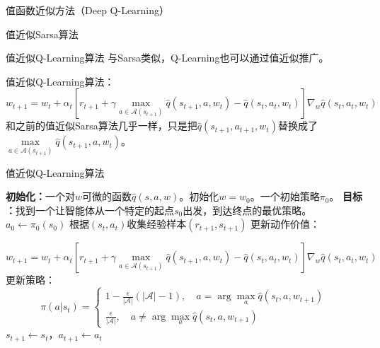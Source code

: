 \begin{section}{值函数近似方法\alert{（Deep Q-Learning）}}
\begin{frame}{值近似Sarsa算法}
\begin{center}
\begin{minipage}{0.3\textwidth}
        \end{minipage}
    \end{center}
    
\end{frame}

\begin{frame}{值近似Q-Learning算法}
    与Sarsa类似，Q-Learning也可以通过值近似推广。

    值近似Q-Learning算法：
    \alert{\[
        w_{t+1}=w_t+\alpha_t\left[r_{t+1}+\gamma \underset{a\in \mathcal{A}(s_{t+1})}{\max}\hat{q}(s_{t+1},a,w_t)-\hat{q}(s_t,a_t,w_t)\right]\nabla_w\hat{q}(s_t,a_t,w_t)
    \]}
    和之前的值近似Sarsa算法几乎一样，只是把$\hat{q}(s_{t+1},a_{t+1},w_t)$替换成了$\underset{a\in \mathcal{A}(s_{t+1})}{\max}\hat{q}(s_{t+1},a,w_t)$。
\end{frame}

\begin{frame}{值近似Q-Learning算法}
    \begin{algorithmic}[1]
        \State \textbf{初始化：}一个对$w$可微的函数$\hat{q}(s,a,w)$。初始化$w=w_0$。一个初始策略$\pi_0$。
        \State \textbf{目标 ：}找到一个让智能体从一个特定的起点$s_0$出发，到达终点的最优策略。
            \State $a_0\leftarrow\pi_0(s_0)$
                \State 根据$(s_t,a_t)$收集经验样本$(r_{t+1}, s_{t+1})$
                \State 更新动作价值：

                $w_{t+1}=w_t+\alpha_t[r_{t+1}+\gamma \underset{a\in \mathcal{A}(s_{t+1})}{\max}\hat{q}(s_{t+1},a,w_t)-\hat{q}(s_t,a_t,w_t)]\nabla_w\hat{q}(s_t,a_t,w_t)$
                \State 更新策略：
                \[
                    \pi(a|s_t)=\begin{cases}
                        1-\frac{\epsilon}{|\mathcal{A}|}(|\mathcal{A}|-1),\quad a=\arg\max_{a}\hat{q}(s_t,a,w_{t+1}) \\
                        \frac{\epsilon}{|\mathcal{A}|},\quad a \neq \arg\max_{a}\hat{q}(s_t,a,w_{t+1})
                    \end{cases}
                \]
                \State $s_{t+1}\leftarrow s_t$，$a_{t+1}\leftarrow a_t$
            \EndWhile
        \EndFor
    \end{algorithmic}
\end{frame}


\end{section}
